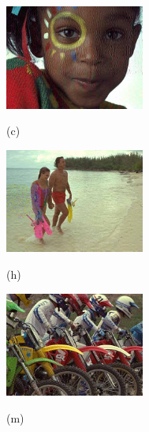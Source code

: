 \begin{figure}[!]
		\begin{minipage}[t]{.32\linewidth}
			\includegraphics[width=1.8in]{TID/i15_13_3.jpg}
			\centerline{(c)}
		\end{minipage}
		\begin{minipage}[t]{.32\linewidth}
			\includegraphics[width=1.8in]{TID/i12_13_5.jpg}
			\centerline{(h)}
		\end{minipage}
		\begin{minipage}[t]{.32\linewidth}
			\includegraphics[width=1.8in]{TID/i05_13_3.jpg}
			\centerline{(m)}
		\end{minipage}
		

\end{figure}
